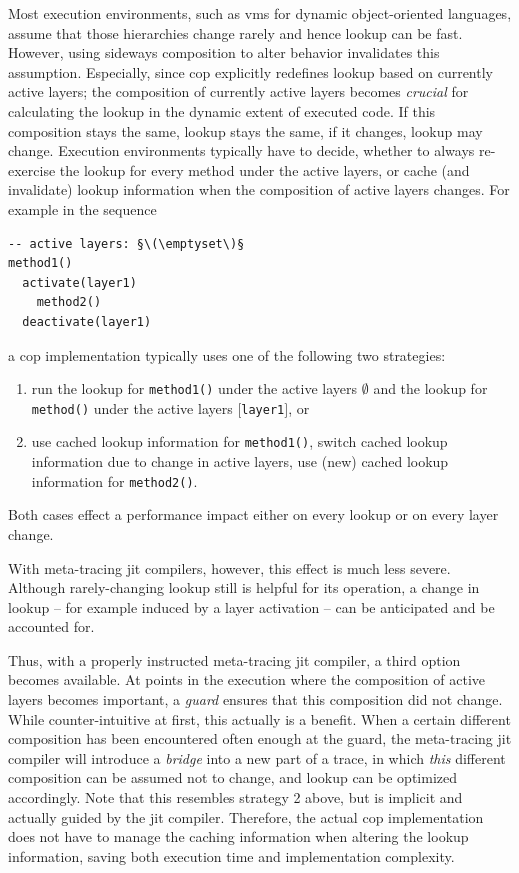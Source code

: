 \documentclass[preprint,english,10pt,nonatbib]{sigplanconf}
\begin{document}
Most execution environments, such as \acp{vm} for dynamic object-oriented
languages, assume that those hierarchies change rarely and hence lookup can be
fast. However, using sideways composition to alter behavior invalidates this
assumption. Especially, since \ac{cop} explicitly redefines lookup based on
currently active layers; the composition of currently active layers becomes
\emph{crucial} for calculating the lookup in the dynamic extent of executed
code. If this composition stays the same, lookup stays the same, if it changes,
lookup may change. Execution environments typically have to decide, whether to
always re-exercise the lookup for every method under the active layers, or
cache (and invalidate) lookup information when the composition of active layers
changes. For example in the sequence
\begin{lstlisting}
-- active layers: §\(\emptyset\)§
method1()
  activate(layer1)
    method2()
  deactivate(layer1)
\end{lstlisting}
a \ac{cop} implementation typically uses one of the following two strategies:
\begin{enumerate}
\item run the lookup for \lstinline|method1()| under the active layers
  \(\emptyset\) and the lookup for \lstinline|method()| under the active layers
  \([\)\lstinline|layer1|\(]\), or
\item use cached lookup information for \lstinline|method1()|, switch cached
  lookup information due to change in active layers, use (new) cached lookup
  information for \lstinline|method2()|.
\end{enumerate}
Both cases effect a performance impact either on every lookup or on every
layer change.

With meta-tracing \ac{jit} compilers, however, this effect is much less
severe. Although rarely-changing lookup still is helpful for its operation, a
change in lookup \--- for example induced by a layer activation \--- can be
anticipated and be accounted for.

Thus, with a properly instructed meta-tracing \ac{jit} compiler, a third option
becomes available. At points in the execution where the composition of active
layers becomes important, a \emph{guard} ensures that this composition did not
change. While counter-intuitive at first, this actually is a benefit. When a
certain different composition has been encountered often enough at the guard,
the meta-tracing \ac{jit} compiler will introduce a \emph{bridge} into a new
part of a trace, in which \emph{this} different composition can be assumed not
to change, and lookup can be optimized accordingly. Note that this resembles
strategy 2 above, but is implicit and actually guided by the \ac{jit} compiler.
Therefore, the actual \ac{cop} implementation does not have to manage the
caching information when altering the lookup information, saving both execution
time and implementation complexity.
\end{document}
